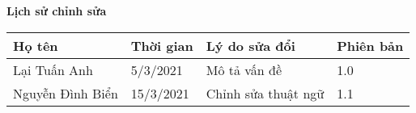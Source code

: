 \documentclass[./main.tex]{subfiles}
\begin{document}
	\begin{center}
		\Large{\textbf{Lịch sử chỉnh sửa}}
		\begin{table}[H]
\begin{tabular}{|p{}|p{}|p{}|p{}|}
				\hline
				\textbf{Họ tên}  & \textbf{Thời gian} & \textbf{Lý do sửa đổi} & \textbf{Phiên bản} \\ \hline
				Lại Tuấn Anh     & 5/3/2021           & Mô tả vấn đề           & 1.0                \\ \hline
				Nguyễn Đình Biển & 15/3/2021          & Chỉnh sửa thuật ngữ    & 1.1                \\ \hline
			\end{tabular}
		\end{table}
	\end{center}
	
\end{document}
